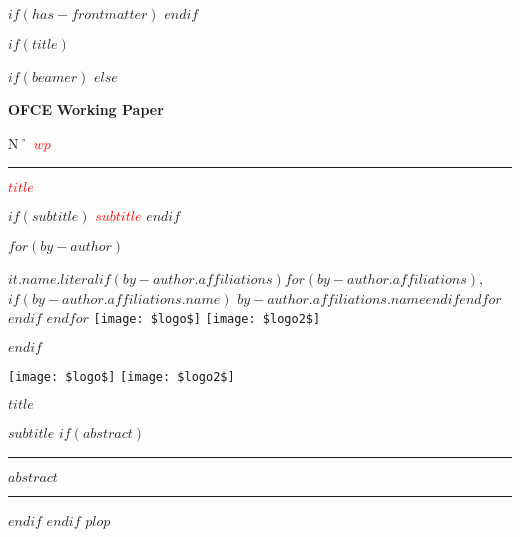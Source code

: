 
$if(has-frontmatter)$
\frontmatter
$endif$

$if(title)$

$if(beamer)$
\frame{\titlepage}
$else$

\begin{titlepage}
\raisebox{9.5cm}
{
   \begin{minipage}{0.22\linewidth}
  
  \large\textbf{OFCE}
  \newline
  \large\textbf{Working Paper}
  \newline

  N˚ \textcolor{red}{\LARGE\textbf{$wp$}}

\end{minipage} 
} 
%
%
\begin{minipage}{0.02\linewidth}
    \rule{1pt}{\textheight}
\end{minipage} 
%
%
%
\begin{minipage}{0.7\linewidth}
 \textcolor{red}{\Huge\textbf{\textsf{$title$}}}
 
 $if(subtitle)$
\vspace{5mm}
 \textcolor{red}{\textbf{\textsf{$subtitle$}}}
\vspace{5mm}
 $endif$
 \vspace{20mm}
 
 $for(by-author)$ 
 
  \textbf{$it.name.literal$}$if(by-author.affiliations)$$for(by-author.affiliations)$,$if(by-author.affiliations.name)$
          $by-author.affiliations.name$$endif$$endfor$
  $endif$
$endfor$ %
\raisebox{-5cm}
{
  \texttt{[image: \$logo\$]} \hspace{1cm}  \texttt{[image: \$logo2\$]}
}
%
\end{minipage}

%
\end{titlepage}
$endif$
%
%
\newpage
\pagestyle{empty}
\begin{minipage}{\linewidth}

  \texttt{[image: \$logo\$]} \hspace{8cm}  \texttt{[image: \$logo2\$]}

\end{minipage}

\vspace{2cm}

\LARGE\textbf{$title$}

\large\textbf{$subtitle$}
$if(abstract)$

\vspace{2cm}

\begin{center}

\end{center}
\par\rule{\textwidth}{0.5pt} 

$abstract$

\par\rule{\textwidth}{0.5pt} 


$endif$
$endif$
$plop$
